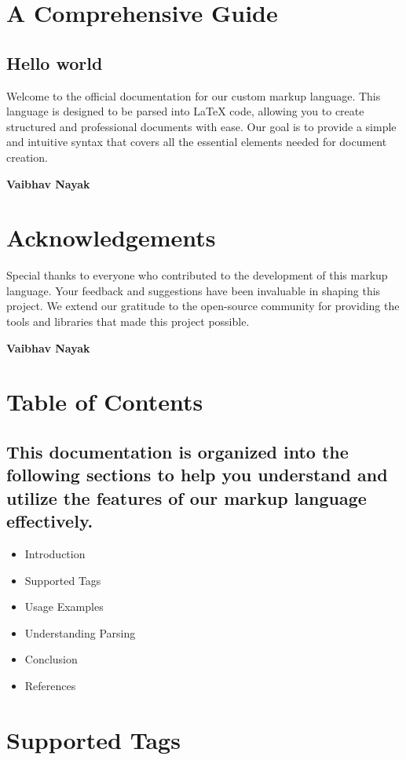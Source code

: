 \documentclass[oneside]{memoir}
\begin{document}
\tableofcontents

\newpage
\chapter{A Comprehensive Guide}
\section{Hello world}
Welcome to the official documentation for our custom markup language. This language is designed to be parsed into LaTeX code, allowing you to create structured and professional documents with ease. Our goal is to provide a simple and intuitive syntax that covers all the essential elements needed for document creation.\par
\hfill \textbf{Vaibhav Nayak}
\date{2024-06-14}

\newpage
\chapter{Acknowledgements}
Special thanks to everyone who contributed to the development of this markup language. Your feedback and suggestions have been invaluable in shaping this project. We extend our gratitude to the open-source community for providing the tools and libraries that made this project possible.\par
\hfill \textbf{Vaibhav Nayak}
\date{2024-06-14}

\newpage
\chapter{Table of Contents}
\section{This documentation is organized into the following sections to help you understand and utilize the features of our markup language effectively.}
\begin{itemize}
\item Introduction
\item Supported Tags
\item Usage Examples
\item Understanding Parsing
\item Conclusion
\item References
\end{itemize}

\newpage
\chapter{Supported Tags}
\end{document}
